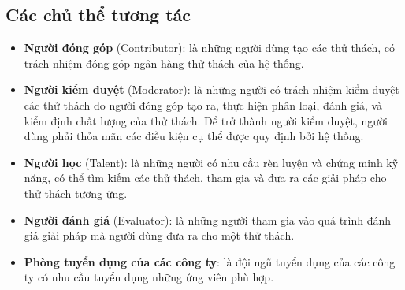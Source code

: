 \subsection{Các chủ thể tương tác}
\begin{itemize}
  \item \textbf{Người đóng góp} (Contributor): là những người dùng tạo các thử thách, có trách nhiệm đóng góp ngân hàng thử thách của hệ thống.
  \item \textbf{Người kiểm duyệt} (Moderator): là những người có trách nhiệm kiểm duyệt các thử thách do người đóng góp tạo ra, thực hiện phân loại, đánh giá, và kiểm định chất lượng của thử thách. Để trở thành người kiểm duyệt, người dùng phải thỏa mãn các điều kiện cụ thể được quy định bởi hệ thống.
  \item \textbf{Người học} (Talent): là những người có nhu cầu rèn luyện và chứng minh kỹ năng, có thể tìm kiếm các thử thách, tham gia và đưa ra các giải pháp cho thử thách tương ứng.
  \item \textbf{Người đánh giá} (Evaluator): là những người tham gia vào quá trình đánh giá giải pháp mà người dùng đưa ra cho một thử thách.
  \item \textbf{Phòng tuyển dụng của các công ty}: là đội ngũ tuyển dụng của các công ty có nhu cầu tuyển dụng những ứng viên phù hợp.
\end{itemize}

